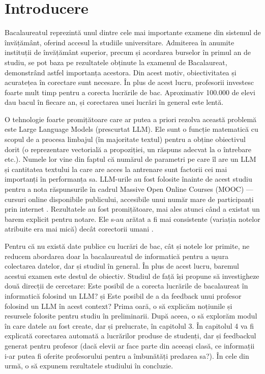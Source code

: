 \chapter{Introducere}
Bacalaureatul reprezintă unul dintre cele mai importante examene din sistemul de învățământ, oferind accesul la studiile universitare.
Admiterea în anumite instituții de învățământ superior, precum și acordarea burselor în primul an de studiu, se pot baza pe rezultatele obținute la examenul de Bacalaureat, demonstrând astfel importanța acestora.
Din acest motiv, obiectivitatea și acuratețea în corectare sunt necesare.
În plus de acest lucru, profesorii investesc foarte mult timp pentru a corecta lucrările de bac. Aproximativ 100.000 de elevi dau bacul în fiecare an, și corectarea unei lucrări în general este lentă.

O tehnologie foarte promițătoare care ar putea a priori rezolva această problemă este Large Language Models (prescurtat LLM). Ele sunt o funcție matematică cu scopul de a procesa limbajul (în majoritate textul) pentru a obține obiectivul dorit (o reprezentare vectorială a propoziției, un răspuns adecvat la o întrebare etc.).
Numele lor vine din faptul că numărul de parametri pe care îl are un LLM și cantitatea textului la care are acces la antrenare sunt factorii cei mai importanți în performanța sa.
LLM-urile au fost folosite înainte de acest studiu pentru a nota răspunsurile în cadrul Massive Open Online Courses (MOOC) — cursuri online disponibile publicului, accesibile unui număr mare de participanți prin internet \cite{golchin}.
Rezultatele au fost promițătoare, mai ales atunci când a existat un barem explicit pentru notare. Ele s-au arătat a fi mai consistente (variația notelor atribuite era mai mică) decât corectorii umani \cite{golchin}.

Pentru că nu există date publice cu lucrări de bac, cât și notele lor primite, ne reducem abordarea doar la bacalaureatul de informatică pentru a ușura colectarea datelor, dar și studiul în general.
În plus de acest lucru, baremul acestui examen este destul de obiectiv.
Studiul de față își propune să investigheze două direcții de cercetare:
Este posibil de a corecta lucrările de bacalaureat în informatică folosind un LLM? și
Este posibil de a da feedback unui profesor folosind un LLM în acest context?
Prima oară, o să explicăm noțiunile și resursele folosite pentru studiu în preliminarii. După aceea, o să explorăm modul în care datele au fost create, dar și prelucrate, în capitolul 3.
În capitolul 4 va fi explicată corectarea automată a lucrărilor produse de studenți, dar și feedbackul generat pentru profesor
(dacă elevii ar face parte din aceeași clasă, ce informații i-ar putea fi oferite profesorului pentru a îmbunătăți predarea sa?).
În cele din urmă, o să expunem rezultatele studiului în concluzie.